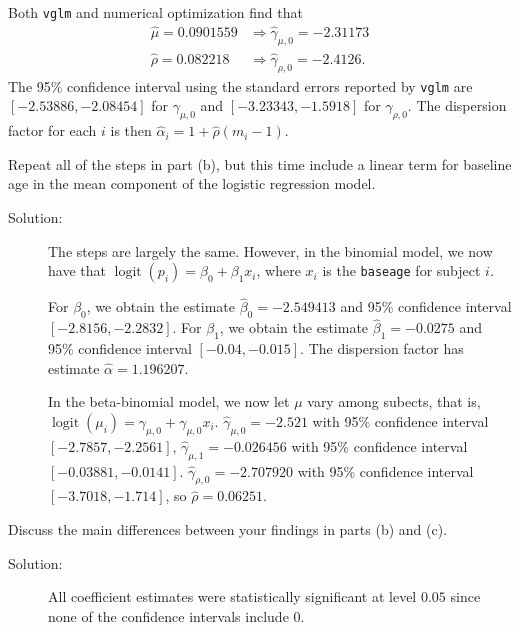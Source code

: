 \documentclass[11pt, letterpaper]{article}
\begin{document}
\begin{enumerate}[(a)]
\begin{description}
  Both \texttt{vglm} and numerical optimization find that
  \begin{align*}
    \hat{\mu} = 0.0901559 &\Rightarrow \hat{\gamma}_{\mu,0} = -2.31173 \\
    \hat{\rho} = 0.082218 &\Rightarrow \hat{\gamma}_{\rho,0} = -2.4126.
  \end{align*}
  The 95\% confidence interval using the standard errors reported by
  \texttt{vglm} are $\left[-2.53886, -2.08454\right]$ for $\gamma_{\mu,0}$ and
  $\left[-3.23343, -1.5918\right]$ for $\gamma_{\rho,0}$. The dispersion factor
  for each $i$ is then $\hat{\alpha}_i = 1 + \hat{\rho}\left(m_i - 1\right)$.
\end{description}
{\em \item Repeat all of the steps in part (b), but this time include a linear term for baseline age 
  in the mean component of the logistic regression model.}

\begin{description}
\item[Solution:] The steps are largely the same. However, in the binomial model,
  we now have that $\operatorname{logit}\left(p_i\right) = \beta_0 + \beta_1x_i$, where $x_i$ is the
  \texttt{baseage} for subject $i$.

  For $\beta_0$, we obtain the estimate $\hat{\beta}_0 = -2.549413$ and 95\%
  confidence interval $\left[-2.8156, -2.2832\right]$. For $\beta_1$, we obtain
  the estimate $\hat{\beta}_1 = -0.0275$ and 95\% confidence interval
  $\left[-0.04, -0.015\right]$. The dispersion factor has estimate
  $\hat{\alpha} = 1.196207$.

  In the beta-binomial model, we now let $\mu$ vary among subects, that is,
  $\operatorname{logit}\left(\mu_i\right) = \gamma_{\mu,0} + \gamma_{\mu,0}x_i.$
  $\hat{\gamma}_{\mu,0} = -2.521$ with 95\% confidence interval
  $\left[-2.7857, -2.2561\right]$, $\hat{\gamma}_{\mu,1} = -0.026456$ with 95\%
  confidence interval $\left[-0.03881, -0.0141\right]$.
  $\hat{\gamma}_{\rho,0} = -2.707920$ with 95\% confidence interval
  $\left[-3.7018, -1.714\right]$, so $\hat{\rho} = 0.06251$.
\end{description}

{\em \item Discuss the main differences between your findings in parts (b) and (c).}

\begin{description}
\item[Solution:] All coefficient estimates were statistically significant at
  level $0.05$ since none of the confidence intervals include $0$.


\end{description}
\end{enumerate}
\end{document}
